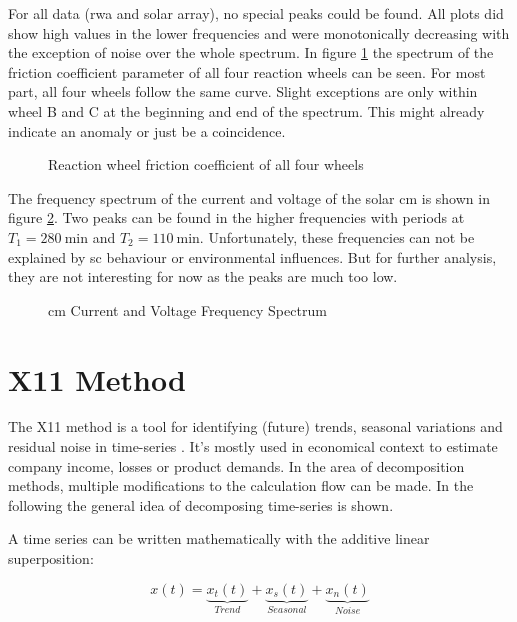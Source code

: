 For all data (\ac{rwa} and solar array), no special peaks could be found. All plots did show high values in the lower frequencies and were monotonically decreasing with the exception of noise over the whole spectrum. In figure \ref{f:rwl_fft} the spectrum of the friction coefficient parameter of all four reaction wheels can be seen. For most part, all four wheels follow the same curve. Slight exceptions are only within wheel B and C at the beginning and end of the spectrum. This might already indicate an anomaly or just be a coincidence.

\begin{figure}[htb]
\centering

\caption{Reaction wheel friction coefficient of all four wheels}
\label{f:rwl_fft}
\end{figure}

The frequency spectrum of the current and voltage of the solar \ac{cm} is shown in figure \ref{f:sa_fft}. Two peaks can be found in the higher frequencies with periods at $T_1 = \SI{280}{\minute}$ and $T_2=\SI{110}{\minute}$. Unfortunately, these frequencies can not be explained by \ac{sc} behaviour or environmental influences. But for further analysis, they are not interesting for now as the peaks are much too low.

\begin{figure}[htb]
\centering

\caption{\ac{cm} Current and Voltage Frequency Spectrum}
\label{f:sa_fft}
\end{figure}

\section{X11 Method}
The X11 method is a tool for identifying (future) trends, seasonal variations and residual noise in time-series \cite{x11-book}. It's mostly used in economical context to estimate company income, losses or product demands. In the area of decomposition methods, multiple modifications to the calculation flow can be made. In the following the general idea of decomposing time-series is shown.

A time series can be written mathematically with the additive linear superposition:

\begin{equation*}
x(t) = \underbrace{x_t(t)}_{Trend} + \underbrace{x_s(t)}_{Seasonal} + \underbrace{x_n(t)}_{Noise}
\end{equation*}
 
